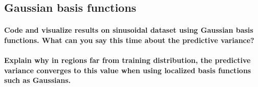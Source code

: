 \subsection{Gaussian basis functions}
\paragraph*{Code and visualize results on sinusoidal dataset using Gaussian basis functions. What can you say this time about the predictive variance?}

\paragraph*{Explain why in regions far from training distribution, the predictive variance converges to this value when using localized basis functions such as Gaussians.}


